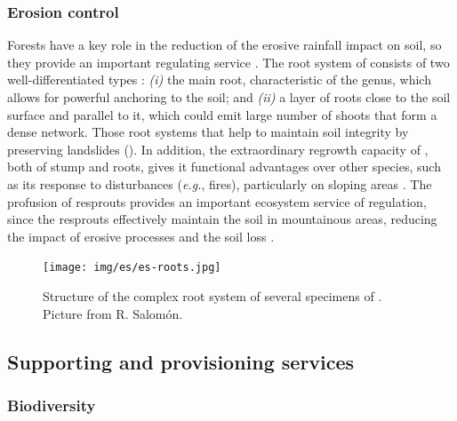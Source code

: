\subsubsection{Erosion control}\label{sec:es:regulation-erosion}
Forests have a key role in the reduction of the erosive rainfall impact on soil, so they provide an important regulating service \autocites{Zhongmingetal2010StratifiedVegetation,GarciaRuizetal2011MediterraneanWater}. The root system of \Qp consists of two well-differentiated types \autocites{Allue1995OrdenacionMasas}: \emph{(i)} the main root, characteristic of the genus, which allows for powerful anchoring to the soil; and \emph{(ii)} a layer of roots close to the soil surface and parallel to it, which could emit large number of shoots that form a dense network. Those root systems that help to maintain soil integrity by preserving landslides \autocites{MesonMontoya1985VegetacionForestal,Salomonetal2017GeneralFailure} (). In addition, the extraordinary regrowth capacity of \Qp, both of stump and roots, gives it functional advantages over other species, such as its response to disturbances (\emph{e.g.}, fires), particularly on sloping areas \autocites{RuizdelaTorre2006FloraMayor,ValbuenaCarabanaGil2017CentenaryCoppicing}. The profusion of resprouts provides an important ecosystem service of regulation, since the resprouts effectively maintain the soil in mountainous areas, reducing the impact of erosive processes and the soil loss  \autocites{MesonGarcia1984BasesEcologicas}.

\begin{figure}
    \centering
    \texttt{[image: img/es/es-roots.jpg]}\caption{Structure of the complex root system of several specimens of \Qp. Picture from R. Salomón.}\label{fig:es:roots}
\end{figure}

\subsection{Supporting and provisioning services}\label{sec:es:provision}
\subsubsection{Biodiversity}\label{sec:es:provision-biodiversity}

